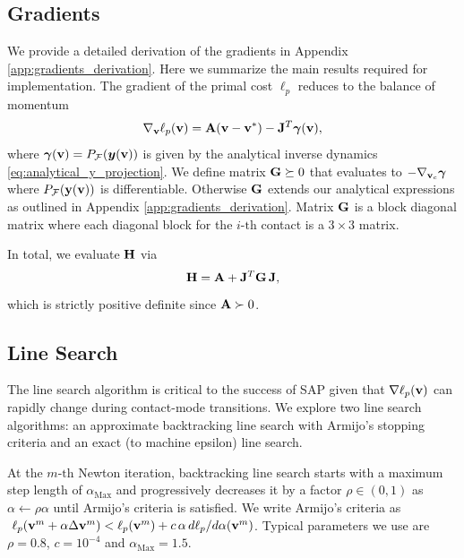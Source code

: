 \subsection{Gradients}
\label{sec:gradients}

We provide a detailed derivation of the gradients in Appendix
\ref{app:gradients_derivation}. Here we summarize the main results required for
implementation. The gradient of the primal cost $\ell_p$ reduces to the balance
of momentum
\begin{equation*}
	\nabla_{\mathbf{v}}\ell_p({\mathbf{v}}) = {\mathbf{A}}({\mathbf{v}}-{\mathbf{v}}^*) - {\mathbf{J}}^T{\bm\gamma}({\mathbf{v}}),
\end{equation*}
where ${\bm\gamma}({\mathbf{v}})=P_\mathcal{F}({\bm{y}}({\mathbf{v}}))$ is given by the analytical
inverse dynamics \eqref{eq:analytical_y_projection}. We define matrix
${\mathbf{G}}\succeq 0$ that evaluates to $-\nabla_{{\mathbf{v}}_c}{\bm\gamma}$ where
$P_\mathcal{F}({\mathbf{y}}({\mathbf{v}}))$ is differentiable. Otherwise ${\mathbf{G}}$ extends
our analytical expressions as outlined in Appendix
\ref{app:gradients_derivation}. Matrix ${\mathbf{G}}$ is a block diagonal matrix where
each diagonal block for the $i\text{-th}$ contact is a $3\times 3$ matrix.

In total, we evaluate ${\mathbf{H}}$ via
\begin{equation*}
	{\mathbf{H}} = {\mathbf{A}} + {\mathbf{J}}^T{\mathbf{G}}\,{\mathbf{J}},
\end{equation*}
which is strictly positive definite since ${\mathbf{A}}\succ 0$.

\subsection{Line Search}

The line search algorithm is critical to the success of SAP given that $\nabla
\ell_p({\mathbf{v}})$ can rapidly change during contact-mode transitions.  We explore
two line search algorithms: an approximate backtracking line search with
Armijo's stopping criteria and an exact (to machine epsilon) line search.

At the $m\text{-th}$ Newton iteration, backtracking line search starts with a
maximum step length of $\alpha_\text{Max}$ and progressively decreases it by a
factor $\rho \in (0, 1)$ as $\alpha\gets\rho\alpha$ until Armijo's criteria
\cite[\S 3.1]{bib:nocedal2006numerical} is satisfied. We write Armijo's criteria
as $~\ell_p({\mathbf{v}}^m + \alpha \Delta{\mathbf{v}}^{m}) < \ell_p({\mathbf{v}}^m) +
c\,\alpha\,d\ell_p/d\alpha({\mathbf{v}}^m)$. Typical parameters we use are $\rho=0.8$,
$c=10^{-4}$ and $\alpha_\text{Max}=1.5$.

